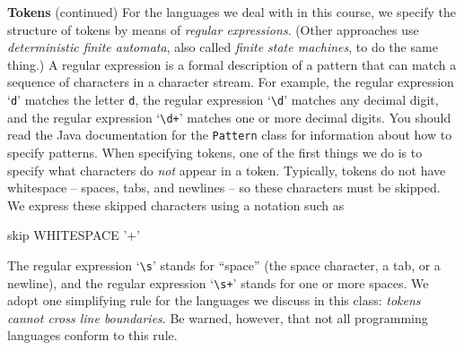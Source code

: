 \begin{minipage}[t]{\sw}
\slidenumber
\LARGE
{\bf Tokens} (continued)\exx
For the languages we deal with in this course,
we specify the structure of tokens
by means of {\em regular expressions}.
(Other approaches use {\em deterministic finite automata},
also called {\em finite state machines}, to do the same thing.)
A regular expression is a formal description of a pattern
that can match a sequence of characters in a character stream.
For example, the regular expression `\verb'd'' matches the letter \verb'd',
the regular expression `\verb'\d'' matches any decimal digit,
and the regular expression `\verb'\d+'' matches
one or more decimal digits.
You should read the Java documentation for the \verb'Pattern' class
for information about how to specify patterns.\exx
When specifying tokens,
one of the first things we do is to specify
what characters do {\em not} appear in a token.
Typically, tokens do not have whitespace -- spaces, tabs, and newlines --
so these characters must be skipped.
We express these skipped characters using a notation such as
\begin{qv}
skip WHITESPACE '\s+'
\end{qv}
The regular expression `\verb'\s'' stands for ``space''
(the space character, a tab, or a newline),
and the regular expression `\verb'\s+'' stands for one or more spaces.\exx
We adopt one simplifying rule for the languages we discuss in this class:
{\em tokens cannot cross line boundaries}.
Be warned, however, that not all programming languages conform to this rule.

\end{minipage}
